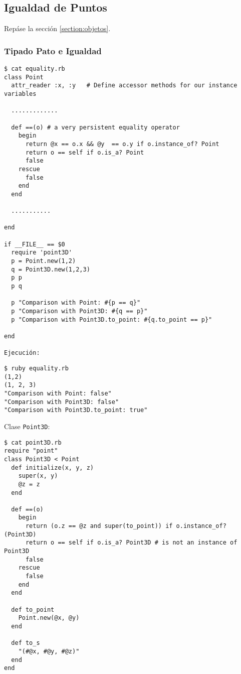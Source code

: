 \subsection{Igualdad de Puntos}

Repáse la sección \ref{section:objetos}.

\subsubsection{Tipado Pato e Igualdad}

\begin{verbatim}
$ cat equality.rb 
class Point
  attr_reader :x, :y   # Define accessor methods for our instance variables

  .............

  def ==(o) # a very persistent equality operator
    begin
      return @x == o.x && @y  == o.y if o.instance_of? Point
      return o == self if o.is_a? Point
      false
    rescue
      false
    end
  end

  ...........

end

if __FILE__ == $0
  require 'point3D'
  p = Point.new(1,2)
  q = Point3D.new(1,2,3)
  p p
  p q

  p "Comparison with Point: #{p == q}"
  p "Comparison with Point3D: #{q == p}"
  p "Comparison with Point3D.to_point: #{q.to_point == p}"

end

Ejecución:

\end{verbatim}

\begin{verbatim}
$ ruby equality.rb 
(1,2)
(1, 2, 3)
"Comparison with Point: false"
"Comparison with Point3D: false"
"Comparison with Point3D.to_point: true"

\end{verbatim}
Clase \verb|Point3D|:
\begin{verbatim}
$ cat point3D.rb 
require "point"
class Point3D < Point
  def initialize(x, y, z)
    super(x, y)
    @z = z
  end

  def ==(o)
    begin
      return (o.z == @z and super(to_point)) if o.instance_of?(Point3D)
      return o == self if o.is_a? Point3D # is not an instance of Point3D
      false
    rescue
      false
    end
  end

  def to_point
    Point.new(@x, @y)
  end

  def to_s
    "(#@x, #@y, #@z)"
  end
end

\end{verbatim}

